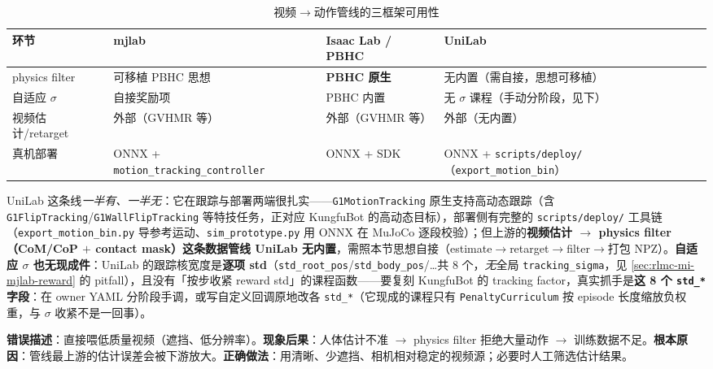 \begin{table}[ht]
\centering
\small
\caption{视频$\to$动作管线的三框架可用性}
\label{tab:rlmc-mi-kungfu3}
\begin{tabular}{@{}llll@{}}
\toprule
环节 & mjlab & Isaac Lab / PBHC & UniLab \\
\midrule
physics filter & 可移植 PBHC 思想 & \textbf{PBHC 原生} & 无内置（需自接，思想可移植） \\
自适应 $\sigma$ & 自接奖励项 & PBHC 内置 & 无 $\sigma$ 课程（手动分阶段，见下） \\
视频估计/retarget & 外部（GVHMR 等） & 外部（GVHMR 等） & 外部（无内置） \\
真机部署 & ONNX + \verb|motion_tracking_controller| & ONNX + SDK & ONNX + \verb|scripts/deploy/|（\verb|export_motion_bin|） \\
\bottomrule
\end{tabular}
\end{table}

UniLab 这条线\emph{一半有、一半无}：它在跟踪与部署两端很扎实——\verb|G1MotionTracking| 原生支持高动态跟踪（含 \verb|G1FlipTracking|/\verb|G1WallFlipTracking| 等特技任务，正对应 KungfuBot 的高动态目标），部署侧有完整的 \verb|scripts/deploy/| 工具链（\verb|export_motion_bin.py| 导参考运动、\verb|sim_prototype.py| 用 ONNX 在 MuJoCo 逐段校验）；但上游的\textbf{视频估计 $\to$ physics filter（CoM/CoP $+$ contact mask）这条数据管线 UniLab 无内置}，需照本节思想自接（estimate$\to$retarget$\to$filter$\to$打包 NPZ）。\textbf{自适应 $\sigma$ 也无现成件}：UniLab 的跟踪核宽度是\textbf{逐项 std}（\verb|std_root_pos|/\verb|std_body_pos|/\dots 共 8 个，\emph{无}全局 \verb|tracking_sigma|，见 \cref{sec:rlmc-mi-mjlab-reward} 的 pitfall），且没有「按步收紧 reward std」的课程函数——要复刻 KungfuBot 的 tracking factor，真实抓手是\textbf{这 8 个 \texttt{std\_*} 字段}：在 owner YAML 分阶段手调，或写自定义回调原地改各 \verb|std_*|（它现成的课程只有 \verb|PenaltyCurriculum| 按 episode 长度缩放负权重，与 $\sigma$ 收紧不是一回事）。

\begin{pitfall}
\textbf{错误描述}：直接喂低质量视频（遮挡、低分辨率）。\textbf{现象后果}：人体估计不准 $\to$ physics filter 拒绝大量动作 $\to$ 训练数据不足。\textbf{根本原因}：管线最上游的估计误差会被下游放大。\textbf{正确做法}：用清晰、少遮挡、相机相对稳定的视频源；必要时人工筛选估计结果。
\end{pitfall}

